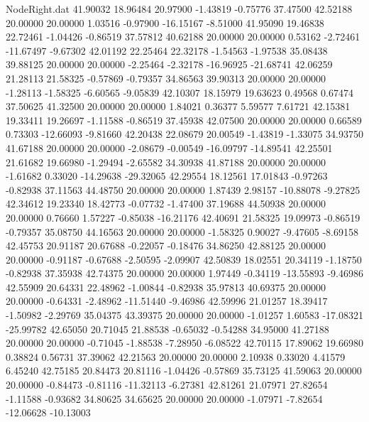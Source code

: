 \begin{filecontents}{NodeRight.dat}
  41.90032   18.96484   20.97900    -1.43819   -0.75776   37.47500   42.52188   20.00000   20.00000    1.03516   -0.97900  -16.15167   -8.51000
  41.95090   19.46838   22.72461    -1.04426   -0.86519   37.57812   40.62188   20.00000   20.00000    0.53162   -2.72461  -11.67497   -9.67302
  42.01192   22.25464   22.32178    -1.54563   -1.97538   35.08438   39.88125   20.00000   20.00000   -2.25464   -2.32178  -16.96925  -21.68741
  42.06259   21.28113   21.58325    -0.57869   -0.79357   34.86563   39.90313   20.00000   20.00000   -1.28113   -1.58325   -6.60565   -9.05839
  42.10307   18.15979   19.63623     0.49568    0.67474   37.50625   41.32500   20.00000   20.00000    1.84021    0.36377    5.59577    7.61721
  42.15381   19.33411   19.26697    -1.11588   -0.86519   37.45938   42.07500   20.00000   20.00000    0.66589    0.73303  -12.66093   -9.81660
  42.20438   22.08679   20.00549    -1.43819   -1.33075   34.93750   41.67188   20.00000   20.00000   -2.08679   -0.00549  -16.09797  -14.89541
  42.25501   21.61682   19.66980    -1.29494   -2.65582   34.30938   41.87188   20.00000   20.00000   -1.61682    0.33020  -14.29638  -29.32065
  42.29554   18.12561   17.01843    -0.97263   -0.82938   37.11563   44.48750   20.00000   20.00000    1.87439    2.98157  -10.88078   -9.27825
  42.34612   19.23340   18.42773    -0.07732   -1.47400   37.19688   44.50938   20.00000   20.00000    0.76660    1.57227   -0.85038  -16.21176
  42.40691   21.58325   19.09973    -0.86519   -0.79357   35.08750   44.16563   20.00000   20.00000   -1.58325    0.90027   -9.47605   -8.69158
  42.45753   20.91187   20.67688    -0.22057   -0.18476   34.86250   42.88125   20.00000   20.00000   -0.91187   -0.67688   -2.50595   -2.09907
  42.50839   18.02551   20.34119    -1.18750   -0.82938   37.35938   42.74375   20.00000   20.00000    1.97449   -0.34119  -13.55893   -9.46986
  42.55909   20.64331   22.48962    -1.00844   -0.82938   35.97813   40.69375   20.00000   20.00000   -0.64331   -2.48962  -11.51440   -9.46986
  42.59996   21.01257   18.39417    -1.50982   -2.29769   35.04375   43.39375   20.00000   20.00000   -1.01257    1.60583  -17.08321  -25.99782
  42.65050   20.71045   21.88538    -0.65032   -0.54288   34.95000   41.27188   20.00000   20.00000   -0.71045   -1.88538   -7.28950   -6.08522
  42.70115   17.89062   19.66980     0.38824    0.56731   37.39062   42.21563   20.00000   20.00000    2.10938    0.33020    4.41579    6.45240
  42.75185   20.84473   20.81116    -1.04426   -0.57869   35.73125   41.59063   20.00000   20.00000   -0.84473   -0.81116  -11.32113   -6.27381
  42.81261   21.07971   27.82654    -1.11588   -0.93682   34.80625   34.65625   20.00000   20.00000   -1.07971   -7.82654  -12.06628  -10.13003

\end{filecontents}
